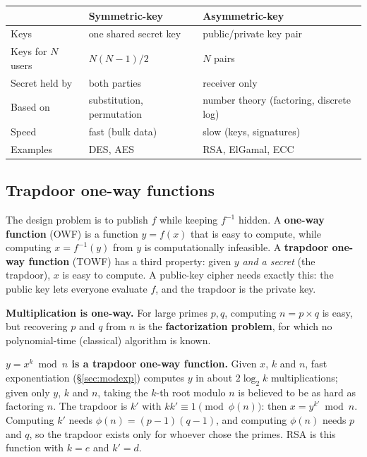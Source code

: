 \begin{center}\small
\begin{tabular}{@{}lll@{}}
\toprule
 & Symmetric-key & Asymmetric-key\\
\midrule
Keys & one shared secret key & public/private key pair\\
Keys for $N$ users & $N(N-1)/2$ & $N$ pairs\\
Secret held by & both parties & receiver only\\
Based on & substitution, permutation & number theory (factoring, discrete log)\\
Speed & fast (bulk data) & slow (keys, signatures)\\
Examples & DES, AES & RSA, ElGamal, ECC\\
\bottomrule
\end{tabular}
\end{center}

\subsection{Trapdoor one-way functions \new}
The design problem is to publish $f$ while keeping $f^{-1}$ hidden. A \textbf{one-way function} (OWF) is a function $y = f(x)$ that is easy to compute, while computing $x = f^{-1}(y)$ from $y$ is computationally infeasible. A \textbf{trapdoor one-way function} (TOWF) has a third property: given $y$ \emph{and a secret} (the trapdoor), $x$ is easy to compute. A public-key cipher needs exactly this: the public key lets everyone evaluate $f$, and the trapdoor is the private key.

\textbf{Multiplication is one-way.} For large primes $p, q$, computing $n = p \times q$ is easy, but recovering $p$ and $q$ from $n$ is the \textbf{factorization problem}, for which no polynomial-time (classical) algorithm is known.

\textbf{$y = x^k \bmod n$ is a trapdoor one-way function.} Given $x$, $k$ and $n$, fast exponentiation (\S\ref{sec:modexp}) computes $y$ in about $2\log_2 k$ multiplications; given only $y$, $k$ and $n$, taking the $k$-th root modulo $n$ is believed to be as hard as factoring $n$. The trapdoor is $k'$ with $k k' \equiv 1 \pmod{\phi(n)}$: then $x = y^{k'} \bmod n$. Computing $k'$ needs $\phi(n) = (p-1)(q-1)$, and computing $\phi(n)$ needs $p$ and $q$, so the trapdoor exists only for whoever chose the primes. RSA is this function with $k = e$ and $k' = d$.

